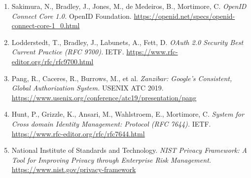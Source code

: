 \documentclass[11pt,a4paper]{article}
\begin{document}
\begin{enumerate}[leftmargin=1.5em,itemsep=2pt]
    \item Sakimura, N., Bradley, J., Jones, M., de Medeiros, B., Mortimore, C. \textit{OpenID Connect Core 1.0.} OpenID Foundation. \url{https://openid.net/specs/openid-connect-core-1_0.html}
    \item Lodderstedt, T., Bradley, J., Labunets, A., Fett, D. \textit{OAuth 2.0 Security Best Current Practice (RFC 9700).} IETF. \url{https://www.rfc-editor.org/rfc/rfc9700.html}
    \item Pang, R., Caceres, R., Burrows, M., et al. \textit{Zanzibar: Google's Consistent, Global Authorization System.} USENIX ATC 2019. \url{https://www.usenix.org/conference/atc19/presentation/pang}
    \item Hunt, P., Grizzle, K., Ansari, M., Wahlstroem, E., Mortimore, C. \textit{System for Cross domain Identity Management: Protocol (RFC 7644).} IETF. \url{https://www.rfc-editor.org/rfc/rfc7644.html}
    \item National Institute of Standards and Technology. \textit{NIST Privacy Framework: A Tool for Improving Privacy through Enterprise Risk Management.} \url{https://www.nist.gov/privacy-framework}
\end{enumerate}
\end{document}
